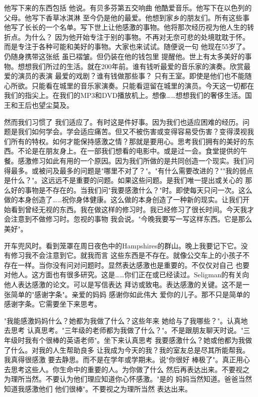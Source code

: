 他写下来的东西包括 他说。有贝多芬第五交响曲 他酷爱音乐。他写下在以色列的父母。他写下香草冰淇淋 至今仍是他的最爱。他想到家乡的朋友们。所有这些事 他写了长长的一个名单。写下世上让他感激的事物。他将那次经历视为他人生的转折点。为什么？ 因为他开始专注于别的事物。不再对无奈可悲的处境耽耽于怀。而是专注于各种可能和美好的事物。大家也来试试。随便说一句 他现在55岁了。仍随身携带这张纸 虽已褶皱。但仍装在他的钱包里 提醒他。世上有太多美好的事物。想想我们所过的生活。就在200年前。谁有钱听最爱的音乐家的演奏。欣赏最爱的演员的表演 最爱的戏剧？谁有钱做那些事？ 只有王室。即使是他们也不能随心所欲。只能看在城里的音乐家演奏。只能看逗留在城里的演员。今天这一切都在我们的指尖上。在我们的MP3和DVD播放机上。想像……想想我们的奢侈生活。国王和王后也望尘莫及。 

然而我们习惯了 我们适应了。有时这是件好事。因为我们也适应困难的经历。问题是我们如何学会。学会适应痛苦。但又不被伤害或变得容易受伤害？变得漠视我们所有的特权。如何才能保持感激之情？那就是要用心。思考我们拥有的美好的东西。不论是在朋友身上。在一部我们想看的电影中。或是过一会。食堂提供的午餐。感激修习如此有用的一个原因。因为我们所做的是共同创造一个现实。我们问得最多。或被问及最多的问题是"哪里不对了？"。"有什么需要改进的？""我的弱点是什么？"。这远远不是重要的问题。如果这些问题。是我们唯一提出或关心的 那么好的事物是不存在的。当我们问"我要感激什么？"时。即使每天只问一次。这么做的本身创造了……祝你身体健康。这么做的本身创造了一种新的现实。让我们开始看到曾经无视的东西。我在做这样的修习时。我已经修习了很长时间。今天我才会注意到不做修习时。忽视的事物 我会说。"今晚我要写一写这样东西。它是那么美好"。 

开车兜风时。看到笼罩在周日夜色中的Hampshires的群山。晚上我要记下它。没有修习我不会注意到它。就我而言 这些东西是不存在。就像公交车上的小孩子不存在一样。当你没有问对问题时。显然表达感激也是重要的。不仅仅对自己 也要对他人。这方面也有很多研究。这是……你们正在或已经读过。Seligman的有关向他人表达感激的论文。可以是写信表达 拜访或致电。表达感激的关键。这不是一张简单的"感谢字条"。亲爱的妈妈 感谢你如此伟大 爱你的儿子。那不只是简单的感谢字条。它需要坐下来思考。 

"我能感激妈妈什么？她都为我做了什么？这些年来 她给与了我哪些？"。认真地去思考 认真思考。"三年级的老师都为我做了什么？"。不是跟朋友聊天时说。"三年级时我有个很棒的英语老师"。坐下来认真思考 我要感激什么？她或他都为我做了什么。对我的人生帮助良多 让我成为今天的我？我的室友总是尽其所能帮我。我真得很感激 要去静思。而不是在学年或学期未。说"你很好 棒极了"。真正用心去思考这些人。你生命中的重要的人。为你做了什么 然后再表达出来。不要视之为理所当然。不要认为他们理应知道你心怀感激。"是的 妈妈当然知道。爸爸当然知道我感激他们 他们很棒"。不要视之为理所当然 表达出来。 

